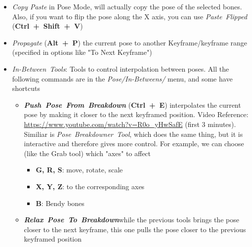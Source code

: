 \documentclass{article}
\begin{document}
\begin{itemize}[topsep=0pt, noitemsep]
    \item \textit{Copy Paste} in Pose Mode, will actually copy the pose of the selected bones. Also, if you want to flip the pose along the X axis, you can use \mbox{\textit{Paste Flipped}} (\mbox{\textbf{Ctrl + Shift + V}})
    \item \textit{Propagate} (\mbox{\textbf{Alt + P}}) the current pose to another Keyframe/keyframe range (specified in options like "To Next Keyframe")
    \item \mbox{\textit{In-Between Tools}}: Tools to control interpolation between poses. All the following commands are in the \mbox{\textit{Pose/In-Betweens/}} menu, and some have shortcuts
    \begin{itemize}[noitemsep]
        \item \mbox{\textbf{\textit{Push Pose From Breakdown}}} (\mbox{\textbf{Ctrl + E}}) interpolates the current pose by making it closer to the next keyframed position. 
        Video Reference: \href{https://www.youtube.com/watch?v=R0o_yHwSafE}{https://www.youtube.com/watch?v=R0o\_yHwSafE} (first 3 minutes).\\ Similiar is \mbox{\textit{Pose Breakdowner Tool}}, which does 
        the same thing, but it is interactive and therefore gives more control. For example, we can choose (like the Grab tool) which "axes" to affect
        \begin{itemize}[topsep=0pt, noitemsep]
            \item \textbf{G, R, S}: move, rotate, scale
            \item \textbf{X, Y, Z}: to the corresponding axes
            \item \textbf{B}: Bendy bones
        \end{itemize}
        \item \mbox{\textbf{\textit{Relax Pose To Breakdown}}}\footnotemark while the previous tools brings the pose closer to the next keyframe, this one pulls the pose closer to the previous keyframed position
    \end{itemize}
\end{itemize}
\end{document}

